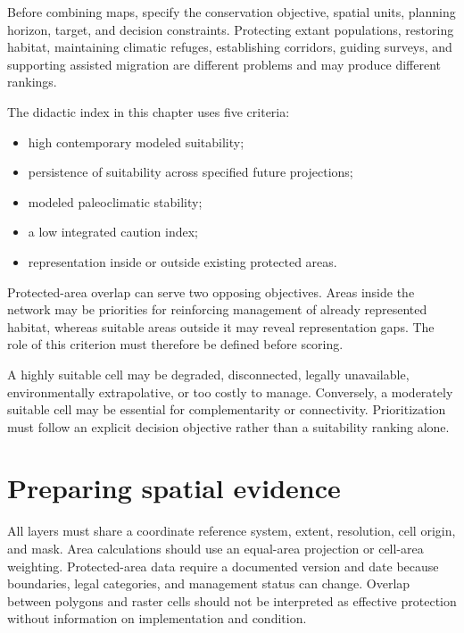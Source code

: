 Before combining maps, specify the conservation objective, spatial units, planning horizon, target, and decision constraints. Protecting extant populations, restoring habitat, maintaining climatic refuges, establishing corridors, guiding surveys, and supporting assisted migration are different problems and may produce different rankings.

The didactic index in this chapter uses five criteria:

\begin{itemize}
\item high contemporary modeled suitability;
\item persistence of suitability across specified future projections;
\item modeled paleoclimatic stability;
\item a low integrated caution index;
\item representation inside or outside existing protected areas.
\end{itemize}

Protected-area overlap can serve two opposing objectives. Areas inside the network may be priorities for reinforcing management of already represented habitat, whereas suitable areas outside it may reveal representation gaps. The role of this criterion must therefore be defined before scoring.

\begin{atencao}[title={\faExclamationTriangle\quad Suitability alone does not define priority}]
A highly suitable cell may be degraded, disconnected, legally unavailable, environmentally extrapolative, or too costly to manage. Conversely, a moderately suitable cell may be essential for complementarity or connectivity. Prioritization must follow an explicit decision objective rather than a suitability ranking alone.
\end{atencao}

\section{Preparing spatial evidence}



All layers must share a coordinate reference system, extent, resolution, cell origin, and mask. Area calculations should use an equal-area projection or cell-area weighting. Protected-area data require a documented version and date because boundaries, legal categories, and management status can change. Overlap between polygons and raster cells should not be interpreted as effective protection without information on implementation and condition.

